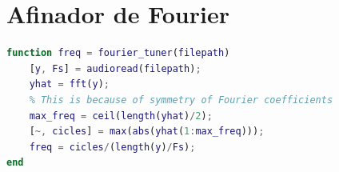 \documentclass{article}
\begin{document}
    \newpage

    \appendix

        \section{Afinador de Fourier}
            \label{appendix:tuner}

            \begin{lstlisting}[language=Matlab]
function freq = fourier_tuner(filepath)
    [y, Fs] = audioread(filepath);
    yhat = fft(y);
    % This is because of symmetry of Fourier coefficients
    max_freq = ceil(length(yhat)/2);
    [~, cicles] = max(abs(yhat(1:max_freq)));
    freq = cicles/(length(y)/Fs);
end
            \end{lstlisting}
\end{document}
